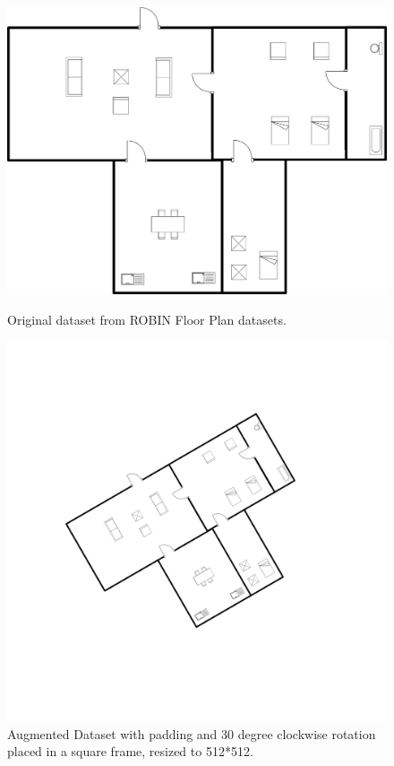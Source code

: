             \begin{figure}
                \centering
                \begin{minipage}{.45\textwidth}
                    \centering
                    \includegraphics[width=.8\linewidth]{img/experiment/dataset/1a.jpg}
                    \caption{Original dataset from ROBIN Floor Plan datasets.}
                    \label{fig:dataset-original}
                \end{minipage}%
                \hfill
                \begin{minipage}{.45\textwidth}
                    \centering
                    \includegraphics[width=.8\linewidth,frame]{img/experiment/dataset/1b.jpg}
                    \caption{Augmented Dataset with padding and 30 degree clockwise rotation placed in a square frame, resized to 512*512.}
                    \label{fig:dataset-augmented}
                \end{minipage}
            \end{figure}
